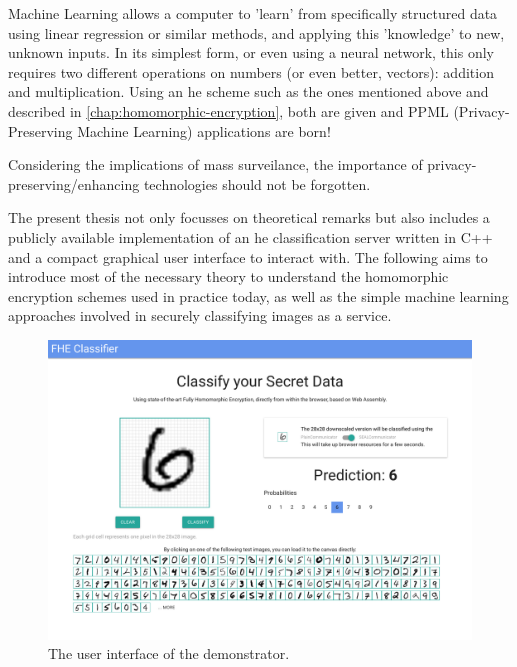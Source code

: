 Machine Learning allows a computer to 'learn' from specifically structured data using linear regression or similar methods, and applying this 'knowledge' to new, unknown inputs.
In its simplest form, or even using a neural network, this only requires two different operations on numbers (or even better, vectors): addition and multiplication.
Using an \gls{he} scheme such as the ones mentioned above and described in \autoref{chap:homomorphic-encryption}, both are given and PPML (Privacy-Preserving Machine Learning) applications are born!

Considering the implications of mass surveilance, the importance of privacy-preserving/enhancing technologies should not be forgotten.

The present thesis not only focusses on theoretical remarks but also includes a publicly available implementation of an \gls{he} classification server written in C++ and a compact graphical user interface to interact with.
The following aims to introduce most of the necessary theory to understand the homomorphic encryption schemes used in practice today, as well as the simple machine learning approaches involved in securely classifying images as a service.

\begin{figure}[H]
  \centering
  \includegraphics[width=\linewidth]{figures/frontend.pdf}
  \caption{The user interface of the demonstrator.}
\end{figure}
